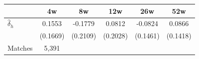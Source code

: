 \begin{tabular}{l*{5}{c}}
\toprule
 & 4w & 8w & 12w & 26w & 52w \\
\midrule
$\hat{\delta}_h$ & 0.1553 & -0.1779 & 0.0812 & -0.0824 & 0.0866 \\
 & (0.1669) & (0.2109) & (0.2028) & (0.1461) & (0.1418) \\
\midrule
Matches & 5,391 \\
\bottomrule
\end{tabular}
